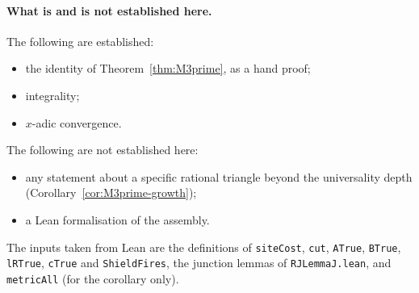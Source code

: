 \documentclass[11pt]{article}
\theoremstyle{plain}
\theoremstyle{definition}
\theoremstyle{remark}
\begin{document}
\paragraph{What is and is not established here.}
The following are established:
\begin{itemize}
\item the identity of Theorem~\ref{thm:M3prime}, as a hand proof;
\item integrality;
\item $x$-adic convergence.
\end{itemize}
The following are not established here:
\begin{itemize}
\item any statement about a specific rational triangle beyond the universality depth
  (Corollary~\ref{cor:M3prime-growth});
\item a Lean formalisation of the assembly.
\end{itemize}
The inputs taken from Lean are the definitions of \texttt{siteCost}, \texttt{cut},
\texttt{ATrue}, \texttt{BTrue}, \texttt{lRTrue}, \texttt{cTrue} and \texttt{ShieldFires}, the
junction lemmas of \texttt{RJLemmaJ.lean}, and \texttt{metricAll} (for the corollary only).
\end{document}
